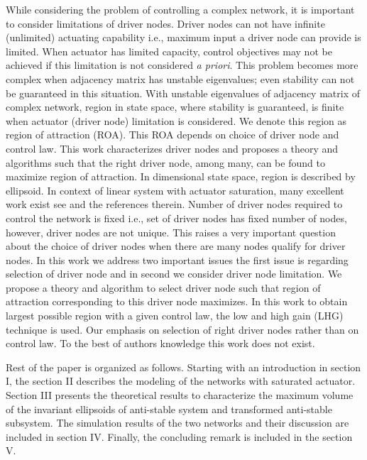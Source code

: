 \documentclass[conference]{IEEEtran}
\begin{document}
\par While considering the problem of controlling a complex network, it is important to consider limitations of driver nodes. Driver nodes can not have infinite (unlimited) actuating capability i.e., maximum input a driver node can provide is limited. When actuator has limited capacity, control objectives may not be achieved if this limitation is not considered  \textit{a priori}. This problem becomes more complex when adjacency matrix has unstable eigenvalues; even stability can not be guaranteed in this situation. With unstable eigenvalues of adjacency matrix of complex network, region in state space, where stability is guaranteed, is finite when actuator (driver node) limitation is considered. We denote this region as region of attraction (ROA). This ROA depends on choice of driver node and control law. This work characterizes driver nodes and proposes a theory and algorithms such that the right driver node, among many, can be found to maximize region of attraction. In  dimensional state space, region is described by ellipsoid. In context of linear system with actuator saturation, many excellent work exist see \cite{gutman1982new,Thu2001actuatorsaturationbook,lauvdal1997stabilization} and the references therein. Number of driver nodes required to control the network is fixed i.e., set of driver nodes has fixed number of nodes, however, driver nodes are not unique. This raises a very important question about the choice of driver nodes when there are many nodes qualify for driver nodes. In this work we address two important issues the first issue is regarding selection of driver node and in second we consider driver node limitation. We propose a theory and algorithm to select driver node such that region of attraction corresponding to this driver node maximizes. In this work to obtain largest possible region with a given control law, the low and high gain (LHG) technique \cite{gutman1982new,turner2001guaranteed, lowhighreview2009,saberi1996control} is used. Our emphasis on selection of right driver nodes rather than on control law. To the best of authors knowledge this work does not exist.

\par Rest of the paper is organized as follows. Starting with an introduction in section I, the section II describes the modeling of the networks with saturated actuator. Section III presents the theoretical results to characterize the maximum volume of the invariant ellipsoids of anti-stable system and transformed anti-stable subsystem. The simulation results of the two networks and their discussion are included in section IV. Finally, the concluding remark is included in the  section V. 
\end{document}
